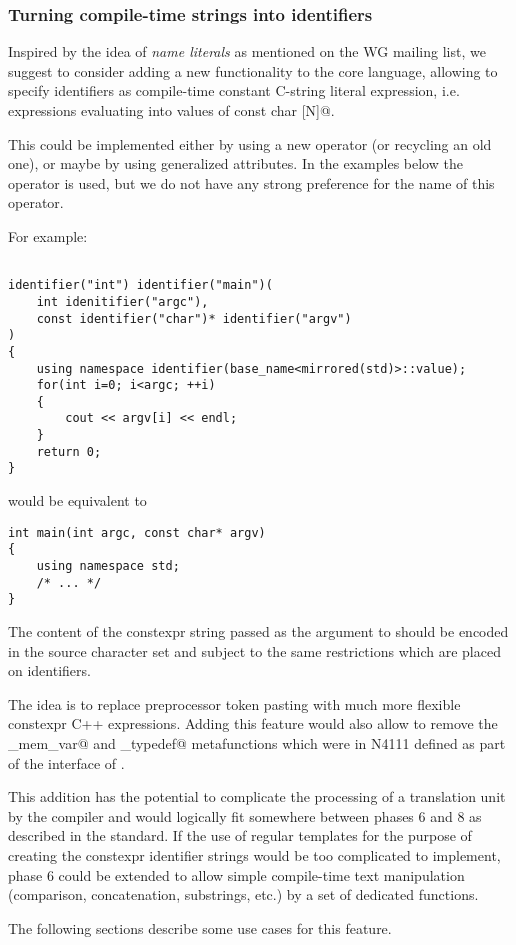 \subsubsection{Turning compile-time strings into identifiers}

Inspired by the idea of {\em name literals} as mentioned on the WG mailing list,
we suggest to consider adding a new functionality to the core language, allowing to specify
identifiers as compile-time constant C-string literal expression, i.e. expressions
evaluating into values of \verb@constexpr const char [N]@.

This could be implemented either by using a new operator (or recycling an old one),
or maybe by using generalized attributes.
In the examples below the \verb@identifier@ operator is used, but we do not have
any strong preference for the name of this operator.

For example:

\begin{verbatim}

identifier("int") identifier("main")(
	int idenitifier("argc"),
	const identifier("char")* identifier("argv")
)
{
	using namespace identifier(base_name<mirrored(std)>::value);
	for(int i=0; i<argc; ++i)
	{
		cout << argv[i] << endl;
	}
	return 0;
}

\end{verbatim}

would be equivalent to

\begin{verbatim}
int main(int argc, const char* argv)
{
	using namespace std;
	/* ... */
}
\end{verbatim}

The content of the constexpr string passed as the argument to \verb@identifier@
should be encoded in the source character set and subject to the same restrictions
which are placed on identifiers.

The idea is to replace preprocessor token pasting with much more flexible constexpr C++ expressions.
Adding this feature would also allow to remove the \verb@named_mem_var@ and
\verb@named_typedef@ metafunctions which were in N4111 defined as part of
the interface of .

This addition has the potential to complicate the processing of a translation unit
by the compiler and would logically fit somewhere between phases 6 and 8 as described
in the standard. If the use of regular templates for the purpose of creating the
constexpr identifier strings would be too complicated to implement, phase 6 could
be extended to allow simple compile-time text manipulation (comparison, concatenation,
substrings, etc.) by a set of dedicated functions.

The following sections describe some use cases for this feature.

